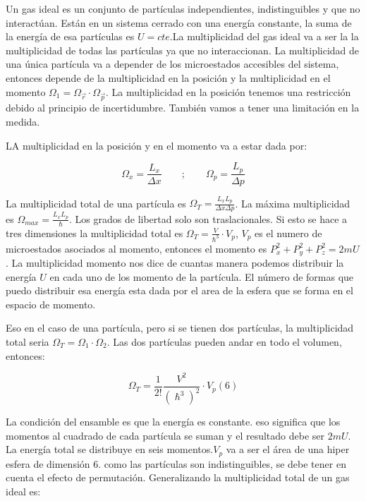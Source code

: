 \documentclass[11pt,fleqn]{book}
\begin{document}
\begin{example}

Un gas ideal es un conjunto de partículas independientes, indistinguibles y que no interactúan. Están en un sistema cerrado con una energía constante, la suma de la energía de esa partículas es $U=cte$.La multiplicidad del gas ideal va a ser la la multiplicidad de todas las partículas ya que no interaccionan. La multiplicidad de una única partícula va a depender de los microestados accesibles del sistema, entonces depende de la multiplicidad en la posición y la multiplicidad en el momento $\Omega_{1}=\Omega_{\Vec{r}}\cdot\Omega_{\Vec{p}}$. La multiplicidad en la posición tenemos una restricción debido al principio de incertidumbre. También vamos a tener una limitación en la medida.

LA multiplicidad en la posición y en el momento va a estar dada por:

\begin{equation*}
    \Omega_{x}=\frac{L_{x}}{\Delta x}\qquad;\qquad  \Omega_{p}=\frac{L_{p}}{\Delta p}
\end{equation*}

La multiplicidad total de una partícula es $\Omega_{T}=\frac{L_{x}L_{p}}{\Delta x\Delta p}$. La máxima multiplicidad es $\Omega_{max}=\frac{L_{x}L_{p}}{\hslash}$. Los grados de libertad solo son traslacionales. Si esto se hace a tres dimensiones la multiplicidad total es $\Omega_{T}=\frac{V}{\hslash^{3}}\cdot V_{p}$, $V_{p}$ es el numero de microestados asociados al momento, entonces el momento es $P_{x}
^{2}+P_{y}^{2}+P_{z}^{2}=2mU$. La multiplicidad momento nos dice de cuantas manera podemos distribuir la energía $U$ en cada uno de los momento de la partícula. El número de formas que puedo distribuir esa energía esta dada por el area de la esfera que se forma en el espacio de momento.

Eso en el caso de una partícula, pero si se tienen dos partículas, la multiplicidad total seria $\Omega_{T}=\Omega_{1}\cdot\Omega_{2}$. Las dos partículas pueden andar en todo el volumen, entonces:

\begin{equation*}
    \Omega_{T}=\frac{1}{2!}\frac{V^{2}}{(\hslash^{3})^{2}}\cdot V_{p}(6)
\end{equation*}
 
La condición del ensamble es que la energía es constante. eso significa que los momentos al cuadrado de cada partícula se suman y el resultado debe ser $2mU$. La energía total se distribuye en seis momentos.$V_{p}$ va a ser el área de una hiper esfera de dimensión 6. como las partículas son indistinguibles, se debe tener en cuenta el efecto de permutación. Generalizando la multiplicidad total de un gas ideal es:


\end{example}
\end{document}
